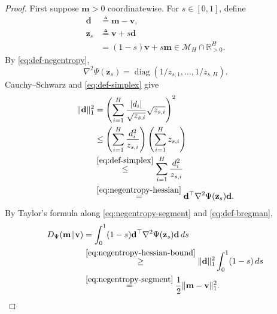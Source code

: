 \documentclass[journal]{IEEEtran}
\theoremstyle{remark}
\begin{document}
\begin{proof}
First suppose $\mathbf{m}>0$ coordinatewise. For $s\in[0,1]$, define
\begin{equation}
\label{eq:negentropy-segment}
\begin{aligned}
\mathbf{d}&\triangleq\mathbf{m}-\mathbf{v},\\
\mathbf{z}_s&\triangleq\mathbf{v}+s\mathbf{d}\\
&=(1-s)\mathbf{v}+s\mathbf{m}
\in\mathcal{M}_H\cap\mathbb{R}_{>0}^H.
\end{aligned}
\end{equation}
By \eqref{eq:def-negentropy},
\begin{equation}
\label{eq:negentropy-hessian}
\nabla^2\Psi(\mathbf{z}_s)
=\operatorname{diag}(1/z_{s,1},\ldots,1/z_{s,H}).
\end{equation}
Cauchy--Schwarz and \eqref{eq:def-simplex} give
\begin{equation}
\label{eq:negentropy-hessian-bound}
\begin{aligned}
\|\mathbf{d}\|_1^2
&=\left(\sum_{i=1}^H
\frac{|d_i|}{\sqrt{z_{s,i}}}\sqrt{z_{s,i}}\right)^2 \\
&\le
\left(\sum_{i=1}^H\frac{d_i^2}{z_{s,i}}\right)
\left(\sum_{i=1}^H z_{s,i}\right) \\
&\overset{\eqref{eq:def-simplex}}{\le}
\sum_{i=1}^H\frac{d_i^2}{z_{s,i}}\\
&\overset{\eqref{eq:negentropy-hessian}}{=}
\mathbf{d}^\top\nabla^2\Psi(\mathbf{z}_s)\mathbf{d}.
\end{aligned}
\end{equation}
By Taylor's formula along \eqref{eq:negentropy-segment} and
\eqref{eq:def-bregman},
\begin{equation}
\label{eq:negentropy-interior-bound}
\begin{aligned}
D_\Psi(\mathbf{m}\|\mathbf{v})
&=\int_0^1(1-s)
\mathbf{d}^\top\nabla^2\Psi(\mathbf{z}_s)\mathbf{d}\,ds \\
&\overset{\eqref{eq:negentropy-hessian-bound}}{\ge}
\|\mathbf{d}\|_1^2\int_0^1(1-s)\,ds
\\
&\overset{\eqref{eq:negentropy-segment}}{=}
\frac12\|\mathbf{m}-\mathbf{v}\|_1^2.
\end{aligned}
\end{equation}


\end{proof}
\end{document}
